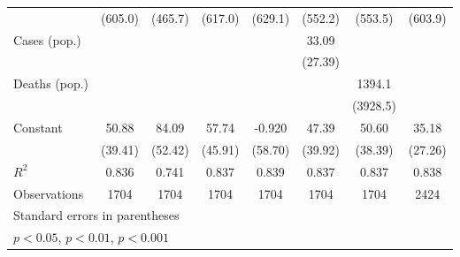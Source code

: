 \documentclass{article}
\begin{document}
{\begin{longtable}{l*{7}{c}}
                &  (605.0)         &  (465.7)         &  (617.0)         &  (629.1)         &  (552.2)         &  (553.5)         &  (603.9)         \\
Cases (pop.)    &                  &                  &                  &                  &    33.09         &                  &                  \\
                &                  &                  &                  &                  &  (27.39)         &                  &                  \\
Deaths (pop.)   &                  &                  &                  &                  &                  &   1394.1         &                  \\
                &                  &                  &                  &                  &                  & (3928.5)         &                  \\
Constant        &    50.88         &    84.09         &    57.74         &   -0.920         &    47.39         &    50.60         &    35.18         \\
                &  (39.41)         &  (52.42)         &  (45.91)         &  (58.70)         &  (39.92)         &  (38.39)         &  (27.26)         \\
\hline
\(R^{2}\)       &    0.836         &    0.741         &    0.837         &    0.839         &    0.837         &    0.837         &    0.838         \\
Observations    &     1704         &     1704         &     1704         &     1704         &     1704         &     1704         &     2424         \\
\hline\hline
\multicolumn{8}{l}{\footnotesize Standard errors in parentheses}\\
\multicolumn{8}{l}{\footnotesize \sym{*} \(p<0.05\), \sym{**} \(p<0.01\), \sym{***} \(p<0.001\)}\\
\end{longtable}
}
\end{document}
